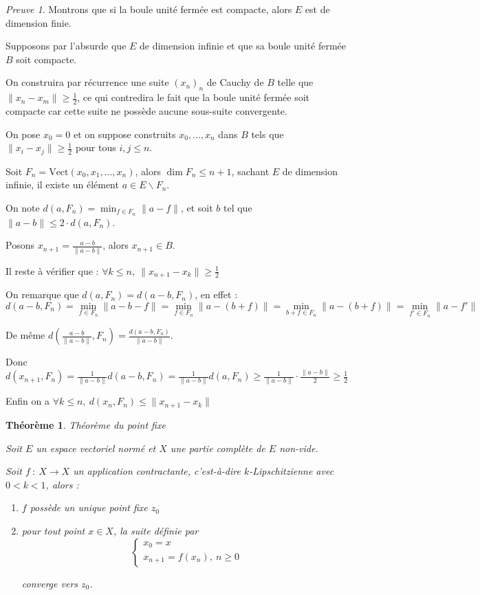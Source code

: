 \documentclass[]{article}
\newtheorem{mythm}{Théorème}
\theoremstyle{remark}
\newtheorem{myproof}{Preuve}
\theoremstyle{definition}
\newcommand{\funcshort}[3]{
#1 ~ : ~ #2 \longrightarrow #3
}
\begin{document}
\begin{myproof}
	Montrons que si la boule unité fermée est compacte, alors $E$ est de dimension finie.
	
	Supposons par l'absurde que $E$ de dimension infinie et que sa boule unité fermée $B$ soit compacte.
	
	On construira par récurrence une suite $(x_n)_n$ de Cauchy de $B$ telle que $\|x_n - x_m\| \geqslant \frac{1}{2}$, ce qui contredira le fait que la boule unité fermée soit compacte car cette suite ne possède aucune sous-suite convergente.
	
	On pose $x_0 = 0$ et on suppose construits $x_0, ..., x_n$ dans $B$ tels que $\|x_i - x_j\| \geqslant \frac{1}{2}$ pour tous $i, j \leqslant n$.
	
	Soit $F_n = \text{Vect}(x_0, x_1, ..., x_n)$, alors $\dim F_n \leqslant n+1$, sachant $E$ de dimension infinie, il existe un élément $a \in E \backslash F_n$.
	
	On note $d(a, F_n) = \min_{f \in F_n} \|a-f\|$, et soit $b$ tel que $\|a-b\| \leqslant 2 \cdot d(a, F_n)$.
	
	Posons $x_{n+1} = \frac{a-b}{\|a-b\|}$, alors $x_{n+1} \in B$.
	
	Il reste à vérifier que : $\forall k \leqslant n, ~ \|x_{n+1} - x_k\| \geqslant \frac{1}{2}$
	
	On remarque que $d(a, F_n)=d(a-b, F_n)$, en effet : $$d(a-b, F_n) = \min_{f \in F_n} \|a-b-f\| = \min_{f \in F_n} \|a-(b+f)\| = \min_{b+f \in F_n} \|a-(b+f)\| = \min_{f' \in F_n} \|a-f'\|$$
	
	De même $d(\frac{a-b}{\|a-b\|}, F_n) = \frac{d(a-b, F_n)}{\|a-b\|}$.
	
	Donc $d(x_{n+1}, F_n) = \frac{1}{\|a-b\|}d(a-b, F_n) = \frac{1}{\|a-b\|}d(a, F_n) \geqslant \frac{1}{\|a-b\|} \cdot \frac{\|a-b\|}{2} \geqslant \frac{1}{2}$
	
	Enfin on a $\forall k \leqslant n, ~ d(x_n, F_n) \leqslant \|x_{n+1} - x_k\|$
\end{myproof}

\begin{mythm}Théorème du point fixe

	Soit $E$ un espace vectoriel normé et $X$ une partie complète de $E$ non-vide.
	
	Soit $\funcshort{f}{X}{X}$ un application contractante, c'est-à-dire $k$-Lipschitzienne avec $0 < k < 1$, alors :
	\begin{enumerate}
		\item $f$ possède un unique point fixe $z_0$
		\item pour tout point $x \in X$, la suite définie par
		$$\left\{
			\begin{array}{l}
				x_0 = x \\
				x_{n+1} = f(x_n), ~ n \geqslant 0
			\end{array}
		\right.$$
		
		converge vers $z_0$.
	\end{enumerate}
\end{mythm}
\end{document}
